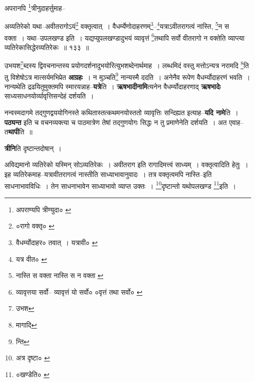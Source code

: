 \documentclass[article,12pt,a4paper]{memoir}
\begin{document}
	  \pstart अपरानपि \footnote{अपराण्यपि त्रीण्युदा० \cite{dp-msD}}\-त्रीनुदाहर्त्तुमाह--
	\pend
       
	  \bigskip
	  \begingroup
	

	  \pstart अव्यतिरेको यथा--अवीतरागोऽयं\footnote{०रागो वक्तृ० \cite{dp-msD} \cite{dp-msB} \cite{dp-edP} \cite{dp-edH} \cite{dp-edE} \cite{dp-edN}} वक्तृत्वात् । वैधर्म्येणोदाहरणम्\footnote{वैधर्म्योदाहर० \cite{dp-msB} \cite{dp-edP} \cite{dp-edH} \cite{dp-edE} \cite{dp-edN} तवात् । यत्रावी० \cite{dp-msC}}\---\footnote{यत्र वीत० \cite{dp-msB} \cite{dp-edP} \cite{dp-edH} \cite{dp-edE}}\-यत्राऽवीतरागत्वं नास्ति, \footnote{नास्ति स वक्ता \cite{dp-msB} \cite{dp-edP} \cite{dp-edH} \cite{dp-edE} नास्ति स न वक्ता \cite{dp-msC}}\-न स वक्ता । यथा--उपलखण्ड इति । यद्यप्युपलखण्डादुभयं व्यावृत्तं \footnote{व्यावृत्तया सर्वो--\cite{dp-msB} \cite{dp-edP} \cite{dp-edH} व्यावृत्तं यो सर्वो० \cite{dp-edE} ०वृत्तं तथा सर्वो० \cite{dp-msC}}\-तथापि सर्वो वीतरागो न वक्तेति व्याप्त्या व्यतिरेकासिद्धेरव्यतिरेकः ॥ १३३ ॥
	\pend
      
	  \endgroup
	
	  \endgroup
	

	  \pstart उभयश\footnote{उभश}\-ब्दस्य द्विवचनान्तस्य प्रयोगदर्शनादुभयोरित्युभशब्देनार्थमाह । लब्धमिदं वस्तु मत्तोऽन्यत्र नरामदि \footnote{मागादि}\-ति तु विशेषोऽत्र मात्सर्यमभिप्रेत \textbf{आग्रहः} । न मुञ्चति\footnote{न्ति} नान्यस्मै ददति । अनेनैव रूपेण वैधर्म्योदाहरणं भवति । नान्यथेति द्रढयितुमुक्तमपि स्मारयन्नाह--\textbf{यत्रे}ति । \textbf{ऋषभादीनामि}त्यनेन वैधर्म्योदाहरणाद् \textbf{ऋषभादेः} साध्यसाधनयोर्व्यावृत्तिसन्देहं दर्शयति ।
	\pend
      

	  \pstart नन्वस्मदागमे तद्गुणद्वययोगिनस्ते कथितास्तत्कथमनयोस्ततो व्यावृत्तिः सन्दिह्यत इत्याह--\textbf{यदि नामे}ति । \textbf{पठ्यन्त} इति च वचनव्यक्त्या च पाठमात्रेण तेषां तद्गुणयोगः सिद्धः न तु प्रमाणेनेति दर्शयति । अत एवाह--त\textbf{थापी}ति ॥
	\pend
      

	  \pstart \textbf{त्रीनि}ति दृष्टान्तदोषान् ।
	\pend
	  \bigskip
	  \begingroup
	

	  \pstart अविद्यमानो व्यतिरेको यस्मिन् सोऽव्यतिरेकः । अवीतराग इति रागादिमत्त्वं साध्यम् । वक्तृत्वादिति हेतुः । इह व्यतिरेकमाह--यत्रावीतरागत्वं नास्तीति साध्याभावानुवादः । तत्र वक्तृत्वमपि नास्ति--इति साधनाभावविधिः । तेन साधनाभावेन साध्याभावो व्याप्त उक्तः । \footnote{अत्र दृष्टा० \cite{dp-msD}}\-दृष्टान्तो यथोपलखण्ड \footnote{०खण्डेति० \cite{dp-msA} \cite{dp-msB} \cite{dp-edP} \cite{dp-edH}}\-इति ।
	\pend
       
\end{document}
